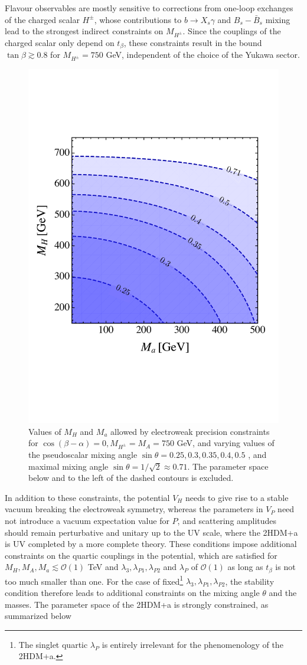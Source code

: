 Flavour observables are mostly sensitive to corrections from one-loop exchanges of the charged scalar ${H^\pm}$, whose contributions to $b \to X_s \gamma$ \cite{Hermann:2012fc,Misiak:2015xwa,Czakon:2015exa} and $B_s-\bar B_s$ mixing \cite{Abbott:1979dt,Geng:1988bq,Buras:1989ui,Eberhardt:2013uba} lead to the strongest indirect constraints on $M_{H^\pm}$. Since the couplings of the charged scalar only depend on $t_\beta$, these constraints result in the bound $\tan \beta \gtrsim 0.8$ for $M_{H^\pm}=750$ GeV, independent of the choice of the Yukawa sector.\\
\begin{figure}
\centering
\includegraphics[width=.5\textwidth]{texinputs/03_theoparameters/Figs/EWPM}
\caption{\label{fig:EWPM}Values of $M_H$ and $M_a$ allowed by electroweak precision constraints for $\cos(\beta-\alpha)=0, M_{H^\pm}=M_A=750$ GeV, and varying values of the pseudoscalar mixing angle $\sin \theta =0.25, 0.3, 0.35, 0.4, 0.5$ , and maximal mixing angle $\sin\theta =1/\sqrt{2}\approx 0.71$. The parameter space below and to the left of the dashed contours is excluded. }
\end{figure}
In addition to these constraints, the potential $V_H$ needs to give rise to a stable vacuum breaking the electroweak symmetry, whereas the parameters in $V_P$ need not introduce a vacuum expectation value for $P$, and scattering amplitudes should remain perturbative \cite{Gunion:2002zf,Barroso:2013awa} and unitary \cite{Kanemura:1993hm,Akeroyd:2000wc,Ginzburg:2005dt,Grinstein:2015rtl} up to the UV scale, where the 2HDM+a is UV completed by a more complete theory.  These conditions impose additional constraints on the quartic couplings in the potential, which are satisfied for $M_H, M_A, M_a \lesssim \mathcal{O}(1)$ TeV and $\lambda_3, \lambda_{P1}, \lambda_{P2}$ and $\lambda_P$ of $\mathcal{O}(1)$ as long as $t_\beta$ is not too much smaller than one. For the case of fixed\footnote{The singlet quartic $\lambda_P$ is entirely irrelevant for the phenomenology of the 2HDM+a.} $\lambda_3, \lambda_{P1}, \lambda_{P2}$, the stability condition therefore leads to additional constraints on the mixing angle $\theta$ and the masses. The parameter space of the 2HDM+a is strongly constrained, as summarized below

